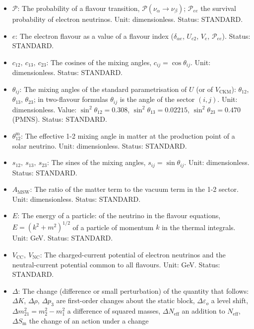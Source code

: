 \documentclass[
  10pt,
]{article}
\providecommand{\tightlist}{%
  \setlength{\itemsep}{0pt}\setlength{\parskip}{0pt}}
\begin{document}
\begin{itemize}
\tightlist
\item
  \(\mathcal{P}\): The probability of a flavour transition,
  \(\mathcal{P}(\nu_\alpha \to \nu_\beta)\); \(\mathcal{P}_{ee}\) the
  survival probability of electron neutrinos. Unit: dimensionless.
  Status: STANDARD.
\item
  \(e\): The electron flavour as a value of a flavour index
  (\(\delta_{\alpha e}\), \(U_{e2}\), \(V_e\), \(\mathcal{P}_{ee}\)).
  Status: STANDARD.
\item
  \(c_{12},\ c_{13},\ c_{23}\): The cosines of the mixing angles,
  \(c_{ij} = \cos\theta_{ij}\). Unit: dimensionless. Status: STANDARD.
\item
  \(\theta_{ij}\): The mixing angles of the standard parametrisation of
  \(U\) (or of \(V_{\mathrm{CKM}}\)): \(\theta_{12}\), \(\theta_{13}\),
  \(\theta_{23}\); in two-flavour formulas \(\theta_{ij}\) is the angle
  of the sector \((i, j)\). Unit: dimensionless. Value:
  \(\sin^2\theta_{12} = 0.308\), \(\sin^2\theta_{13} = 0.02215\),
  \(\sin^2\theta_{23} = 0.470\) (PMNS). Status: STANDARD.
\item
  \(\theta^{\mathrm{m}}_{12}\): The effective 1-2 mixing angle in matter
  at the production point of a solar neutrino. Unit: dimensionless.
  Status: STANDARD.
\item
  \(s_{12},\ s_{13},\ s_{23}\): The sines of the mixing angles,
  \(s_{ij} = \sin\theta_{ij}\). Unit: dimensionless. Status: STANDARD.
\item
  \(A_{\mathrm{MSW}}\): The ratio of the matter term to the vacuum term
  in the 1-2 sector. Unit: dimensionless. Status: STANDARD.
\item
  \(E\): The energy of a particle: of the neutrino in the flavour
  equations, \(E = (k^2 + m^2)^{1/2}\) of a particle of momentum \(k\)
  in the thermal integrals. Unit: GeV. Status: STANDARD.
\item
  \(V_{\mathrm{CC}},\ V_{\mathrm{NC}}\): The charged-current potential
  of electron neutrinos and the neutral-current potential common to all
  flavours. Unit: GeV. Status: STANDARD.
\item
  \(\Delta\): The change (difference or small perturbation) of the
  quantity that follows: \(\Delta K\), \(\Delta\rho\), \(\Delta p_3\)
  are first-order changes about the static block,
  \(\Delta\varepsilon_o\) a level shift,
  \(\Delta m^2_{21} = m_2^2 - m_1^2\) a difference of squared masses,
  \(\Delta N_{\mathrm{eff}}\) an addition to \(N_{\mathrm{eff}}\),
  \(\Delta S_{\mathrm{m}}\) the change of an action under a change

\end{itemize}
\end{document}
